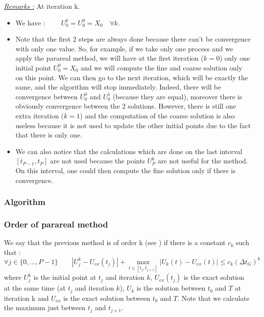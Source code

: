 \noindent \underline{\textit{Remarks :}} At iteration k.
\begin{itemize}[label=-]
	\item We have : $\qquad U_0^k=U_0^0=X_0 \quad \forall k$.
	\item Note that the first 2 steps are always done because there can't be convergence with only one value. So, for example, if we take only one process and we apply the parareal method, we will have at the first iteration ($k=0$) only one initial point $U_0^0=X_0$ and we will compute the fine and coarse solution only on this point. We can then go to the next iteration, which will be exactly the same, and the algorithm will stop immediately. Indeed, there will be convergence between $U_0^0$ and $U_0^1$ (because they are equal), moreover there is obviously convergence between the 2 solutions. However, there is still one extra iteration ($k=1$) and the computation of the coarse solution is also useless because it is not used to update the other initial points due to the fact that there is only one.
	\item We can also notice that the calculations which are done on the last interval $[t_{P-1},t_P]$ are not used because the points $U_P^k$ are not useful for the method. On this interval, one could then compute the fine solution only if there is convergence.
\end{itemize}

\subsubsection{Algorithm}


\subsubsection{Order of parareal method}
\label{order}

We say that the previous method is of order k (see \cite{partie2_ref2}) if there is a constant $c_k$ such that :
\begin{equation}
	\forall j\in\{0,\dots,P-1\} \qquad |U_j^k-U_{ex}(t_j)|+\max_{t\in[t_j,t_{j+1}]}|U_k(t)-U_{ex}(t)|\le c_k(\Delta t_G)^k
\end{equation}
where $U_j^k$ is the initial point at $t_j$ and iteration $k$, $U_{ex}(t_j)$ is the exact solution at the same time (at $t_j$ and iteration $k$), $U_k$ is the solution between $t_0$ and $T$ at iteration k and $U_{ex}$ is the exact solution between $t_0$ and $T$. Note that we calculate the maximum just between $t_j$ and $t_{j+1}$. \\

